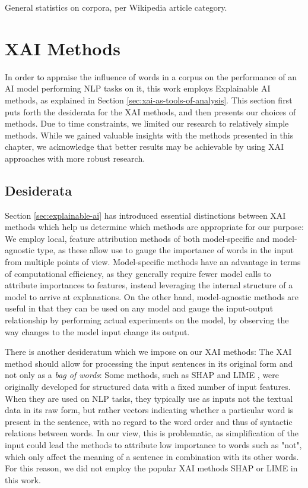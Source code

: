 \begin{table}[ht]
	\centering
	\resizebox{\textwidth}{!}{%
		
	}
	\caption{General statistics on corpora, per Wikipedia article category.}
	\label{tbl:corpus-sizes-per-wiki-category}
\end{table}

\section{XAI Methods} \label{sec:xai-methods}
In order to appraise the influence of words in a corpus on the performance of an AI model performing NLP tasks on it, this work employs Explainable AI methods, as explained in Section \ref{sec:xai-as-tools-of-analysis}.
This section first puts forth the desiderata for the XAI methods, and then presents our choices of methods.
Due to time constraints, we limited our research to relatively simple methods.
While we gained valuable insights with the methods presented in this chapter, we acknowledge that better results may be achievable by using XAI approaches with more robust research.

\subsection{Desiderata}
Section \ref{sec:explainable-ai} has introduced essential distinctions between XAI methods which help us determine which methods are appropriate for our purpose:
We employ local, feature attribution methods of both model-specific and model-agnostic type, as these allow use to gauge the importance of words in the input from multiple points of view.
Model-specific methods have an advantage in terms of computational efficiency, as they generally require fewer model calls to attribute importances to features, instead leveraging the internal structure of a model to arrive at explanations.
On the other hand, model-agnostic methods are useful in that they can be used on any model and gauge the input-output relationship by performing actual experiments on the model, by observing the way changes to the model input change its output.

There is another desideratum which we impose on our XAI methods:
The XAI method should allow for processing the input sentences in its original form and not only as a \textit{bag of words}:
Some methods, such as SHAP \cite{lundbergUnifiedApproachInterpreting2017} and LIME \cite{ribeiroWhyShouldTrust2016}, were originally developed for structured data with a fixed number of input features.
When they are used on NLP tasks, they typically use as inputs not the textual data in its raw form, but rather vectors indicating whether a particular word is present in the sentence, with no regard to the word order and thus of syntactic relations between words.
In our view, this is problematic, as simplification of the input could lead the methods to attribute low importance to words such as "not", which only affect the meaning of a sentence in combination with its other words.
For this reason, we did not employ the popular XAI methods SHAP or LIME in this work.

